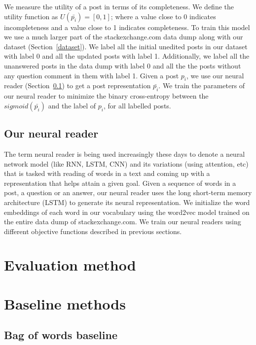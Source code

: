 \documentclass[11pt]{article}
\begin{document}
We measure the utility of a post in terms of its completeness. We define the utility function as $U(\bar{p_i}) = [0, 1]$; where a value close to 0 indicates incompleteness and a value close to 1 indicates completeness. To train this model we use a much larger part of the stackexchange.com data dump along with our dataset (Section~\ref{dataset}). We label all the initial unedited posts in our dataset with label 0 and all the updated posts with label 1. Additionally, we label all the unanswered posts in the data dump with label 0 and all the the posts without any question comment in them with label 1. Given a post $p_i$, we use our neural reader (Section~\ref{neural_readers}) to get a post representation $\bar{p_i}$. We train the parameters of our neural reader to minimize the binary cross-entropy between the $sigmoid(\bar{p_i})$ and the label of $p_i$, for all labelled posts. 

\subsection{Our neural reader}\label{neural_readers}

The term neural reader is being used increasingly these days to denote a neural network model (like RNN, LSTM, CNN) and its variations (using attention, etc) that is tasked with reading of words in a text and coming up with a representation that helps attain a given goal. Given a sequence of words in a post, a question or an answer, our neural reader uses the long short-term memory architecture (LSTM) \cite{hochreiter1997long} to generate its neural representation. We initialize the word embeddings of each word in our vocabulary using the word2vec \cite{mikolov2013efficient} model trained on the entire data dump of stackexchange.com. We train our neural readers using different objective functions described in previous sections. 

\section{Evaluation method}

\section{Baseline methods}

\subsection{Bag of words baseline}
\end{document}
